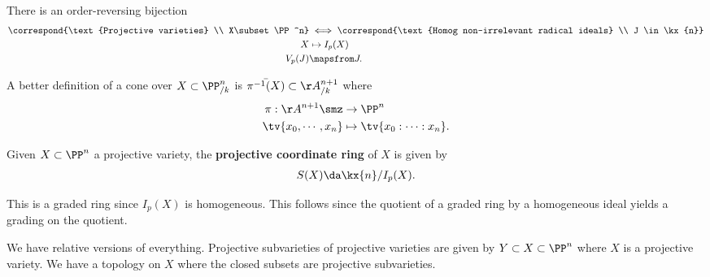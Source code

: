 \begin{corollary}[?]

There is an order-reversing bijection
\begin{align*}  
\correspond{\text{Projective varieties} \\ X\subset \PP^n}
&\iff
\correspond{\text{Homog non-irrelevant radical ideals} \\ J \in \kx{n}} \\
X &\mapsto I_p(X) \\
V_p(J) &\mapsfrom J
.\end{align*}

\end{corollary}

\begin{remark}

A better definition of a cone over \(X\subset \PP^n_{/k}\) is
\(\bar{\pi^{-1}(X)} \subset \AA^{n+1}_{/k}\) where
\begin{align*}  
\pi: \AA^{n+1}\smz &\to \PP^n \\
\tv{x_0, \cdots, x_n} &\mapsto \tv{x_0: \cdots: x_n}
.\end{align*}

\end{remark}

\begin{definition}

Given \(X\subset \PP^n\) a projective variety, the \textbf{projective
coordinate ring} of \(X\) is given by
\begin{align*}  
S(X) \da \kx{n} / I_p(X)
.\end{align*}

\end{definition}

\begin{remark}

This is a graded ring since \(I_p(X)\) is homogeneous. This follows
since the quotient of a graded ring by a homogeneous ideal yields a
grading on the quotient.

\end{remark}

\begin{remark}

We have relative versions of everything. Projective subvarieties of
projective varieties are given by \(Y\subset X\subset \PP^n\) where
\(X\) is a projective variety. We have a topology on \(X\) where the
closed subsets are projective subvarieties.

\end{remark}

